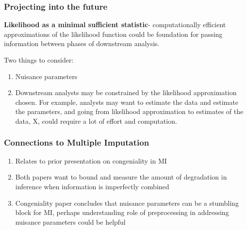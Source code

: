\documentclass[10pt, compress]{beamer}
\begin{document}
\begin{frame}[fragile]
    \frametitle{Projecting into the future}
    
    \textbf{Likelihood as a minimal sufficient statistic}- computationally efficient approximations of the likelihood function could be foundation for passing information between phases of downstream analysis.  
    
    Two things to consider:
    \begin{enumerate}
    \item Nuisance parameters 
    \item Downstream analysts may be constrained by the likelihood approximation chosen. For example, analysts may want to estimate the data and estimate the parameters, and going from likelihood approximation to estimates of the data, X, could require a lot of effort and computation.
    \end{enumerate}

\end{frame}

\begin{frame}[fragile]
    \frametitle{Connections to Multiple Imputation}
    
    \begin{enumerate}
    \item Relates to prior presentation on congeniality in MI
    \item Both papers want to bound and measure the amount of degradation in inference when information is imperfectly combined
    \item Congeniality paper concludes that nuisance parameters can be a stumbling block for MI, perhaps understanding role of preprocessing in addressing nuisance parameters could be helpful
    \end{enumerate}
    
\end{frame}
\end{document}
